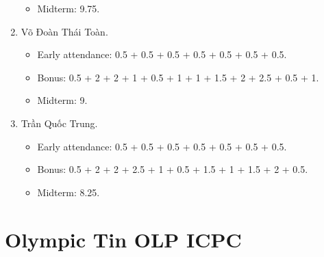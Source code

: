 \documentclass{article}
\begin{document}
\begin{enumerate}
\begin{itemize}
        \item Midterm: 9.75.
	\end{itemize}
	\item {\sc Võ Đoàn Thái Toàn.}
	\begin{itemize}
		\item Early attendance: 0.5 + 0.5 + 0.5 + 0.5 + 0.5 + 0.5 + 0.5.
		\item Bonus: 0.5 + 2 + 2 + 1 + 0.5 + 1 + 1 + 1.5 + 2 + 2.5 + 0.5 + 1.
        \item Midterm: 9.
	\end{itemize}
	\item {\sc Trần Quốc Trung.}
	\begin{itemize}
		\item Early attendance: 0.5 + 0.5 + 0.5 + 0.5 + 0.5 + 0.5 + 0.5.
		\item Bonus: 0.5 + 2 + 2 + 2.5 + 1 + 0.5 + 1.5 + 1 + 1.5 + 2 + 0.5.
        \item Midterm: 8.25.
	\end{itemize}
\end{enumerate}


\section{Olympic Tin OLP ICPC}
\end{document}
